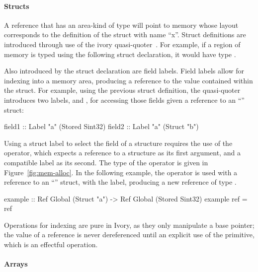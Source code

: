 \paragraph{Structs} A reference that has an area-kind of type 
will point to memory whose layout corresponds to the definition of the struct
with name ``x''.  Struct definitions are introduced through use of the ivory
quasi-quoter~\cite{quoted}.  For example, if a region of memory is typed using
the following struct declaration, it would have type .

\begin{code}
\end{code}

Also introduced by the struct declaration are field labels.  Field labels allow
for indexing into a memory area, producing a reference to the value contained
within the struct.  For example, using the previous struct definition, the
quasi-quoter introduces two labels,  and , for accessing
those fields given a reference to an ``'' struct:

\begin{code}
field1 :: Label "a" (Stored Sint32)
field2 :: Label "a" (Struct "b")
\end{code}

Using a struct label to select the field of a structure requires the use of the
\cd{(\mytilde>)} operator, which expects a reference to a structure as its first
argument, and a compatible label as its second.  The type of the
\cd{(\mytilde>)} operator is given in Figure~\ref{fig:mem-alloc}.  In the
following example, the \cd{(\mytilde>)} operator is used with a reference to an
``'' struct, with the  label, producing a new reference of type
.

\begin{code}
example :: Ref Global (Struct "a")
        -> Ref Global (Stored Sint32)
example ref = ref %
\end{code}

Operations for indexing are pure in Ivory, as they only manipulate a base
pointer; the value of a reference is never dereferenced until an explicit use of
the  primitive, which is an effectful operation.

\paragraph{Arrays}

